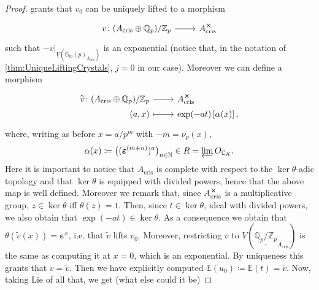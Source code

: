 \begin{proof}
	grants that $v_0$ can be uniquely
	lifted to a morphism
	\begin{equation*}
	\begin{tikzcd}[row sep = 0ex
		,/tikz/column 1/.append style={anchor=base east}
		,/tikz/column 2/.append style={anchor=base west}]
		v\colon ( A_{\mathrm{cris}} \oplus \mathbb{Q}_p) / \mathbb{Z}_{p} 
		\arrow[r, "", rightarrow] &
		A_{\mathrm{cris}}^{\cross}
	\end{tikzcd}
	\end{equation*} 
	such that $\left.-v\right|_{ \underline{V}(\mathbb{G}_m(p)_{A_{\mathrm{cris}}}) }$
	is an exponential (notice that, in the notation of \cref{thm:UniqueLiftingCrystals},
	$j = 0$ in our case).
	Moreover we can define a morphism
	\begin{equation*}
	\begin{tikzcd}[row sep = 0ex
		,/tikz/column 1/.append style={anchor=base east}
		,/tikz/column 2/.append style={anchor=base west}]
		\widetilde{v}\colon 
		(A_{\mathrm{cris}} \oplus \mathbb{Q}_p) / \mathbb{Z}_{p}
		\arrow[r, "", rightarrow] &
		A_{\mathrm{cris}}^{\cross} \\
		(a,x) \arrow[r, "", mapsto] & 
		\exp(-at)\left[ \alpha(x) \right]
	,\end{tikzcd}
	\end{equation*} 
	where, writing as before $x = a/p^m$ with $-m = \nu_p(x)$,
	\begin{equation*}
	\alpha(x) \coloneqq \big( (\boldsymbol\varepsilon^{(m+n)})^a \big)_{n \in \mathbb{N}} \in
	R = \varprojlim O_{\mathbb{C}_K}
	.\end{equation*}
	Here it is important to notice that $A_{\mathrm{cris}}$ is complete
	with respect to the $\ker\theta$-adic topology and that $\ker\theta$
	is equipped with divided powers, hence that the above map is well defined.
	Moreover we remark that, since $A_{\mathrm{cris}}^{\cross}$ is a multiplicative
	group, $z \in \ker\theta$ iff $\theta(z) = 1$.
	Then, since $t \in \ker \theta$, ideal with divided powers, we also obtain that
	$\exp(-at) \in \ker\theta$.
	As a consequence we obtain that $\theta(\widetilde{v}(x)) = \boldsymbol\varepsilon^x$,
	i.e. that $\widetilde{v}$ lifts $v_0$.
	Moreover, restricting $v$ to $\underline{V}
	(\underline{\mathbb{Q}_p/\mathbb{Z}_{p}}_{A_{\mathrm{cris}}})$ 
	is the same as computing it at $x=0$, which is an exponential.
	By uniqueness this grants that $v = \widetilde{v}$.
	Then we have explicitly computed $\mathbb{E}(u_0) \coloneqq \mathbb{E}(t) = \widetilde{v}$.
	Now, taking $\mathrm{Lie}$ of all that, we get (what else could it be)

\end{proof}
